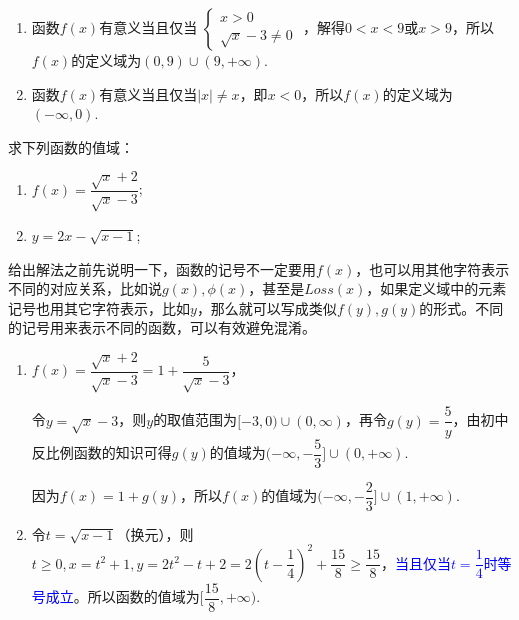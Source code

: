 \documentclass[lang=cn,math=cm,chinesefont=nofont,11pt,scheme=chinese,onecol]{elegantbook}
\begin{document}
\begin{solution}
  \begin{enumerate}
    \item 函数$f(x)$有意义当且仅当
     $\begin{cases}
        x>0
        \\\sqrt{x}-3\neq 0
      \end{cases}$
    ，解得$0<x<9$或$x>9$，所以$f(x)$的定义域为$(0,9)\cup (9,+\infty)$.

    \item 函数$f(x)$有意义当且仅当$\left| x \right|\neq x$，即$x<0$，所以$f(x)$的定义域为$(-\infty,0).$
  \end{enumerate}
\end{solution}

\begin{spacing}{2.0}
  \begin{example}
    求下列函数的值域：
  \end{example}
  
  \begin{enumerate}
    \item $f(x)=\dfrac{\sqrt{x}+2}{\sqrt{x}-3}$;
    \item $y=2x-\sqrt{x-1}$;
  \end{enumerate}
\end{spacing}

给出解法之前先说明一下，函数的记号不一定要用$f(x)$，也可以用其他字符表示不同的对应关系，比如说$g(x),\phi (x)$，甚至是$Loss(x)$，如果定义域中的元素记号也用其它字符表示，比如$y$，那么就可以写成类似$f(y),g(y)$的形式。不同的记号用来表示不同的函数，可以有效避免混淆。

\begin{solution}
  \begin{enumerate}
    \item $f(x)=\dfrac{\sqrt{x}+2}{\sqrt{x}-3}=1+\dfrac{5}{\sqrt{x}-3}$，
    
    令$y=\sqrt{x}-3$，则$y$的取值范围为$[-3,0)\cup (0,\infty)$，再令$g(y)=\dfrac{5}{y}$，由初中反比例函数的知识可得$g(y)$的值域为$(-\infty,-\dfrac{5}{3}]\cup (0,+\infty)$.

    因为$f(x)=1+g(y)$，所以$f(x)$的值域为$(-\infty,-\dfrac{2}{3}]\cup (1,+\infty)$.

    \item 令$t=\sqrt{x-1}$（换元），则$t\geqslant 0,x=t^2+1,y=2t^2-t+2=2(t-\dfrac{1}{4})^2+\dfrac{15}{8}\geqslant\dfrac{15}{8}$，\textcolor{blue}{当且仅当$t=\dfrac{1}{4}$时等号成立}。所以函数的值域为$[\dfrac{15}{8},+\infty).$
  \end{enumerate}
\end{solution}
\end{document}
